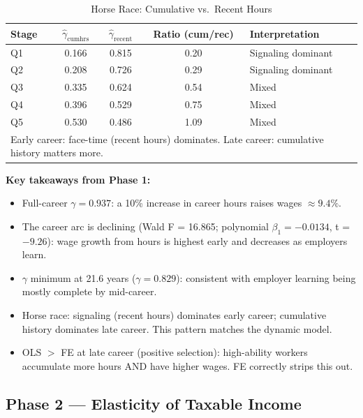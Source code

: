 \documentclass[11pt, letterpaper]{article}
\begin{document}
\begin{table}[h!]
\centering
\caption{Horse Race: Cumulative vs.\ Recent Hours}
\label{tab:horse_race}
\begin{tabular}{lcccl}
\toprule
Stage & $\hat{\gamma}_\text{cumhrs}$ & $\hat{\gamma}_\text{recent}$ & Ratio (cum/rec) & Interpretation \\
\midrule
Q1 & 0.166 & 0.815 & 0.20 & Signaling dominant \\
Q2 & 0.208 & 0.726 & 0.29 & Signaling dominant \\
Q3 & 0.335 & 0.624 & 0.54 & Mixed \\
Q4 & 0.396 & 0.529 & 0.75 & Mixed \\
Q5 & 0.530 & 0.486 & 1.09 & Mixed \\
\bottomrule
\multicolumn{5}{l}{\footnotesize Early career: face-time (recent hours) dominates. Late career: cumulative history matters more.}
\end{tabular}
\end{table}

\textbf{Key takeaways from Phase 1:}
\begin{itemize}
    \item Full-career $\gamma = 0.937$: a 10\% increase in career hours raises wages $\approx 9.4\%$.
    \item The career arc is declining (Wald F = 16.865; polynomial $\beta_1 = -0.0134$, t = $-9.26$): wage growth from hours is highest early and decreases as employers learn.
    \item $\gamma$ minimum at 21.6 years ($\gamma = 0.829$): consistent with employer learning being mostly complete by mid-career.
    \item Horse race: signaling (recent hours) dominates early career; cumulative history dominates late career. This pattern matches the dynamic model.
    \item OLS $>$ FE at late career (positive selection): high-ability workers accumulate more hours AND have higher wages. FE correctly strips this out.
\end{itemize}

\subsection{Phase 2 --- Elasticity of Taxable Income}
\end{document}
